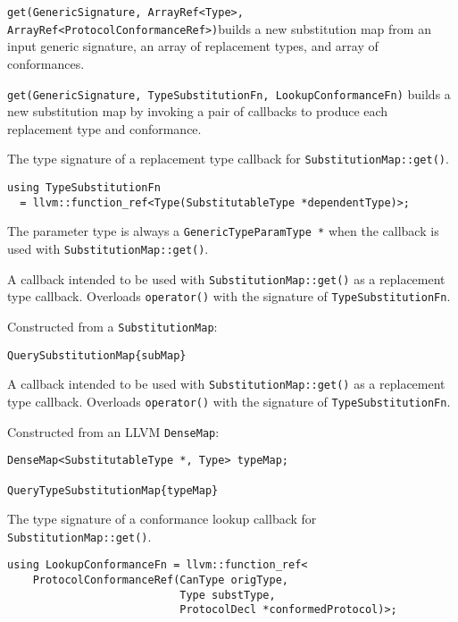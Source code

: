 \documentclass[../generics]{subfiles}
\begin{document}
\medskip
\noindent
\texttt{get(GenericSignature, ArrayRef<Type>, ArrayRef<ProtocolConformanceRef>)}\newline builds a new substitution map from an input generic signature, an array of replacement types, and array of conformances.

\medskip
\noindent
\texttt{get(GenericSignature, TypeSubstitutionFn, LookupConformanceFn)} builds a new substitution map by invoking a pair of callbacks to produce each replacement type and conformance.

The type signature of a replacement type callback for \texttt{SubstitutionMap::get()}.
\begin{verbatim}
using TypeSubstitutionFn
  = llvm::function_ref<Type(SubstitutableType *dependentType)>;
\end{verbatim}
The parameter type is always a \texttt{GenericTypeParamType *} when the callback is used with \texttt{SubstitutionMap::get()}.

A callback intended to be used with \texttt{SubstitutionMap::get()} as a replacement type callback.
Overloads \texttt{operator()} with the signature of \texttt{TypeSubstitutionFn}.

Constructed from a \texttt{SubstitutionMap}:
\begin{Verbatim}
QuerySubstitutionMap{subMap}
\end{Verbatim}

A callback intended to be used with \texttt{SubstitutionMap::get()} as a replacement type callback.
Overloads \texttt{operator()} with the signature of \texttt{TypeSubstitutionFn}.

Constructed from an LLVM \texttt{DenseMap}:
\begin{Verbatim}
DenseMap<SubstitutableType *, Type> typeMap;

QueryTypeSubstitutionMap{typeMap}
\end{Verbatim}

The type signature of a conformance lookup callback for \texttt{SubstitutionMap::get()}.
\begin{verbatim}
using LookupConformanceFn = llvm::function_ref<
    ProtocolConformanceRef(CanType origType,
                           Type substType,
                           ProtocolDecl *conformedProtocol)>;
\end{verbatim}
\end{document}
